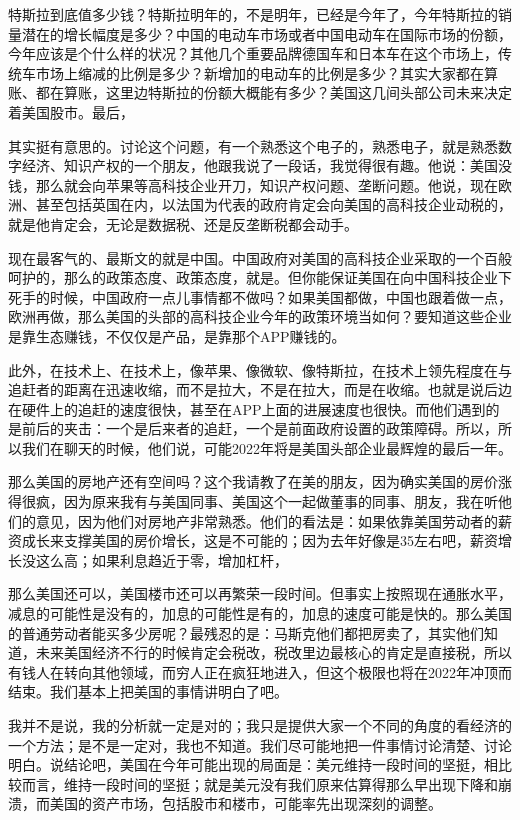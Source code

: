 \documentclass[UTF8, 12pt, a4paper]{ctexrep}
\begin{document}
特斯拉到底值多少钱？特斯拉明年的，不是明年，已经是今年了，今年特斯拉的销量潜在的增长幅度是多少？中国的电动车市场或者中国电动车在国际市场的份额，今年应该是个什么样的状况？其他几个重要品牌德国车和日本车在这个市场上，传统车市场上缩减的比例是多少？新增加的电动车的比例是多少？其实大家都在算账、都在算账，这里边特斯拉的份额大概能有多少？美国这几间头部公司未来决定着美国股市。最后，

其实挺有意思的。讨论这个问题，有一个熟悉这个电子的，熟悉电子，就是熟悉数字经济、知识产权的一个朋友，他跟我说了一段话，我觉得很有趣。他说：美国没钱，那么就会向苹果等高科技企业开刀，知识产权问题、垄断问题。他说，现在欧洲、甚至包括英国在内，以法国为代表的政府肯定会向美国的高科技企业动税的，就是他肯定会，无论是数据税、还是反垄断税都会动手。

现在最客气的、最斯文的就是中国。中国政府对美国的高科技企业采取的一个百般呵护的，那么的政策态度、政策态度，就是。但你能保证美国在向中国科技企业下死手的时候，中国政府一点儿事情都不做吗？如果美国都做，中国也跟着做一点，欧洲再做，那么美国的头部的高科技企业今年的政策环境当如何？要知道这些企业是靠生态赚钱，不仅仅是产品，是靠那个APP赚钱的。

此外，在技术上、在技术上，像苹果、像微软、像特斯拉，在技术上领先程度在与追赶者的距离在迅速收缩，而不是拉大，不是在拉大，而是在收缩。也就是说后边在硬件上的追赶的速度很快，甚至在APP上面的进展速度也很快。而他们遇到的是前后的夹击：一个是后来者的追赶，一个是前面政府设置的政策障碍。所以，所以我们在聊天的时候，他们说，可能2022年将是美国头部企业最辉煌的最后一年。

那么美国的房地产还有空间吗？这个我请教了在美的朋友，因为确实美国的房价涨得很疯，因为原来我有与美国同事、美国这个一起做董事的同事、朋友，我在听他们的意见，因为他们对房地产非常熟悉。他们的看法是：如果依靠美国劳动者的薪资成长来支撑美国的房价增长，这是不可能的；因为去年好像是35左右吧，薪资增长没这么高；如果利息趋近于零，增加杠杆，

那么美国还可以，美国楼市还可以再繁荣一段时间。但事实上按照现在通胀水平，减息的可能性是没有的，加息的可能性是有的，加息的速度可能是快的。那么美国的普通劳动者能买多少房呢？最残忍的是：马斯克他们都把房卖了，其实他们知道，未来美国经济不行的时候肯定会税改，税改里边最核心的肯定是直接税，所以有钱人在转向其他领域，而穷人正在疯狂地进入，但这个极限也将在2022年冲顶而结束。我们基本上把美国的事情讲明白了吧。

我并不是说，我的分析就一定是对的；我只是提供大家一个不同的角度的看经济的一个方法；是不是一定对，我也不知道。我们尽可能地把一件事情讨论清楚、讨论明白。说结论吧，美国在今年可能出现的局面是：美元维持一段时间的坚挺，相比较而言，维持一段时间的坚挺；就是美元没有我们原来估算得那么早出现下降和崩溃，而美国的资产市场，包括股市和楼市，可能率先出现深刻的调整。
\end{document}
